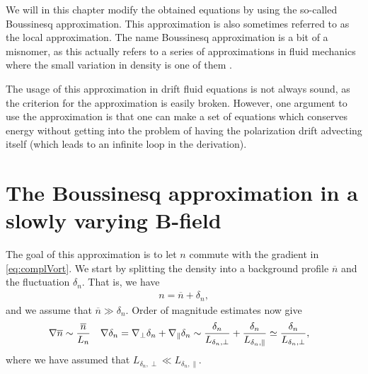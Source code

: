 We will in this chapter modify the obtained equations by using the so-called Boussinesq approximation.
This approximation is also sometimes referred to as the local approximation.
The name Boussinesq approximation is a bit of a misnomer, as this actually refers to a series of approximations in fluid mechanics where the small variation in density is one of them \cite{Kundu2010book}.

The usage of this approximation in drift fluid equations is not always sound, as the criterion for the approximation is easily broken.
However, one argument to use the approximation is that one can make a set of equations which conserves energy without getting into the problem of having the polarization drift advecting itself (which leads to an infinite loop in the derivation).

\section{The Boussinesq approximation in a slowly varying B-field}
\label{sec:boussinesq}
%
The goal of this approximation is to let $n$ commute with the gradient in \cref{eq:complVort}.
We start by splitting the density into a background profile $\overline{n}$ and the fluctuation $\delta_n$.
That is, we have
%
\begin{align*}
    n = \overline{n} + \delta_n,
\end{align*}
%
and we assume that $\overline{n} \gg \delta_n$.
%
Order of magnitude estimates now give
%
\begin{align*}
    &\nabla \overline{n} \sim \frac{\overline{n}}{L_n}&
    &\nabla \delta_n
    =
    \nabla_\perp \delta_n + \nabla_\| \delta_n
    \sim \frac{\delta_n}{L_{\delta_n, \perp}} + \frac{\delta_n}{L_{\delta_n, \|}}
    \simeq \frac{\delta_n}{L_{\delta_n, \perp}},
    &
\end{align*}
%
where we have assumed that $L_{\delta_n, \perp} \ll L_{\delta_n, \|}$.

